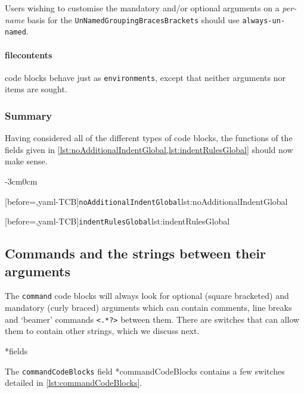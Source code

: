 \documentclass[10pt]{article}
\newenvironment{widepage}{\begin{adjustwidth}{-3cm}{0cm}}{\end{adjustwidth}}
\begin{document}
  Users wishing to customise the mandatory and/or optional arguments on a \emph{per-name}
  basis for the \texttt{UnNamedGroupingBracesBrackets} should use
  \texttt{always-un-named}.

 \paragraph{filecontents} code blocks behave just as \texttt{environments}, except that
  neither arguments nor items are sought.

\subsubsection{Summary}
 Having considered all of the different types of code blocks, the functions of the fields
 given in \cref{lst:noAdditionalIndentGlobal,lst:indentRulesGlobal} should now make sense.

 \begin{widepage}
  \begin{minipage}{.47\linewidth}
   [before=\centering,yaml-TCB]{\texttt{noAdditionalIndentGlobal}}{lst:noAdditionalIndentGlobal}
  \end{minipage}%
  \hfill
  \begin{minipage}{.47\linewidth}
   [before=\centering,yaml-TCB]{\texttt{indentRulesGlobal}}{lst:indentRulesGlobal}
  \end{minipage}%
 \end{widepage}
\subsection{Commands and the strings between their arguments}\label{subsec:commands-string-between} The \texttt{command} code blocks will
 always look for optional (square bracketed) and mandatory (curly braced) arguments which
 can contain comments, line breaks and `beamer' commands \lstinline!<.*?>! between them.
 There are switches that can allow them to contain other strings, which we discuss next.

*{fields}

 The \texttt{commandCodeBlocks} field *{commandCodeBlocks} contains
 a few switches detailed in \cref{lst:commandCodeBlocks}.%
\end{document}
